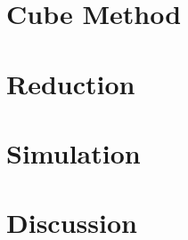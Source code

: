 \documentclass[12pt,english]{article}\usepackage[]{graphicx}\usepackage{xcolor}
\begin{document}
\section{Cube Method}


\section{Reduction}


\section{Simulation}


\section{Discussion}
\end{document}
